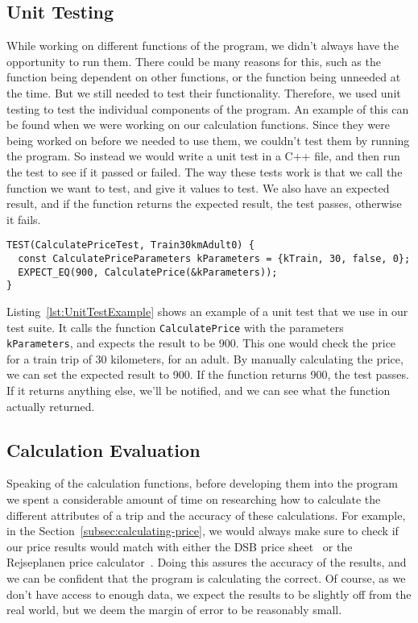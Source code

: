 \subsection{Unit Testing}\label{subsec:unit-testing}

While working on different functions of the program, we didn't always have the opportunity to run them.
There could be many reasons for this, such as the function being dependent on other functions, or the function being
unneeded at the time.
But we still needed to test their functionality.
Therefore, we used unit testing to test the individual components of the program.
An example of this can be found when we were working on our calculation functions.
Since they were being worked on before we needed to use them, we couldn't test them by running the program.
So instead we would write a unit test in a C++ file, and then run the test to see if it passed or failed.
The way these tests work is that we call the function we want to test, and give it values to test.
We also have an expected result, and if the function returns the expected result, the test passes, otherwise it fails.

\begin{lstlisting}[label={lst:UnitTestExample}, caption={Example of a unit test.}]
TEST(CalculatePriceTest, Train30kmAdult0) {
  const CalculatePriceParameters kParameters = {kTrain, 30, false, 0};
  EXPECT_EQ(900, CalculatePrice(&kParameters));
}
\end{lstlisting}

Listing~\ref{lst:UnitTestExample} shows an example of a unit test that we use in our test suite.
It calls the function \texttt{CalculatePrice} with the parameters \texttt{kParameters}, and expects the result to be
900.
This one would check the price for a train trip of 30 kilometers, for an adult.
By manually calculating the price, we can set the expected result to 900.
If the function returns 900, the test passes.
If it returns anything else, we'll be notified, and we can see what the function actually returned.

\subsection{Calculation Evaluation}\label{subsec:calc-evaluation}

Speaking of the calculation functions, before developing them into the program we spent a considerable amount of time
on researching how to calculate the different attributes of a trip and the accuracy of these calculations.
For example, in the Section~\ref{subsec:calculating-price}, we would always make sure to check if our price results
would match with either the DSB price sheet~\cite{price_sheet} or the Rejseplanen price
calculator~\cite{price_calculator}.
Doing this assures the accuracy of the results, and we can be confident that the program is calculating the correct.
Of course, as we don't have access to enough data, we expect the results to be slightly off from the real world, but
we deem the margin of error to be reasonably small.


